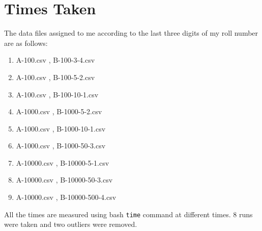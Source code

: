 \documentclass[12pt]{article}
\begin{document}
\section{Times Taken}

The data files assigned to me according to the last three digits of my roll number are as follows:
\begin{enumerate}
    \item { A-100.csv ,  B-100-3-4.csv }
\item { A-100.csv ,  B-100-5-2.csv }
\item { A-100.csv ,  B-100-10-1.csv }
\item { A-1000.csv ,  B-1000-5-2.csv }
\item { A-1000.csv ,  B-1000-10-1.csv }
\item { A-1000.csv ,  B-1000-50-3.csv }
\item { A-10000.csv ,  B-10000-5-1.csv }
\item { A-10000.csv ,  B-10000-50-3.csv }
\item { A-10000.csv ,  B-10000-500-4.csv }
\end{enumerate}
All the times are measured using bash \texttt{time} command at different times. 8 runs were taken and two outliers were removed.
\end{document}

